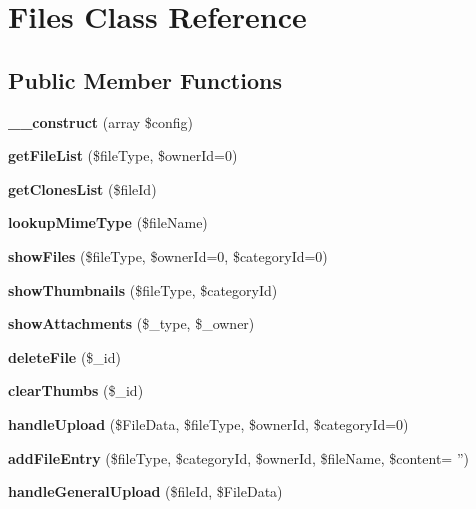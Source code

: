 \section{Files Class Reference}
\label{classFiles}
\subsection*{Public Member Functions}
\begin{CompactItemize}
\item 
{\bf \_\-\_\-construct} (array \$config)\label{classFiles_c8f4e34fc32feec14145501f50628898}

\item 
{\bf getFileList} (\$fileType, \$ownerId=0)\label{classFiles_8e5b2a325b9835fdaa0893b8da95f44a}

\item 
{\bf getClonesList} (\$fileId)\label{classFiles_abfde1bd35967b50d91fcfe577d614e8}

\item 
{\bf lookupMimeType} (\$fileName)\label{classFiles_7e78de9666fc5fadf7f96623f43b21b1}

\item 
{\bf showFiles} (\$fileType, \$ownerId=0, \$categoryId=0)\label{classFiles_5640a3025d33e3a21f44e360e7a1cafd}

\item 
{\bf showThumbnails} (\$fileType, \$categoryId)\label{classFiles_2d8ecb623c95c9f99278f1383c3f3bf3}

\item 
{\bf showAttachments} (\$\_\-type, \$\_\-owner)\label{classFiles_abaa4952b2737e085af51cdda0f9b11b}

\item 
{\bf deleteFile} (\$\_\-id)\label{classFiles_e79bd474c0e99f91c64e702f568f7a26}

\item 
{\bf clearThumbs} (\$\_\-id)\label{classFiles_e0a88d3280d5a780538e63427065cca7}

\item 
{\bf handleUpload} (\$FileData, \$fileType, \$ownerId, \$categoryId=0)\label{classFiles_838ee2d04d8b7444f8055e4e4397483a}

\item 
{\bf addFileEntry} (\$fileType, \$categoryId, \$ownerId, \$fileName, \$content= '')\label{classFiles_c855dc63451a8ceda61818469c9894d1}

\item 
{\bf handleGeneralUpload} (\$fileId, \$FileData)\label{classFiles_7b848b3b181bf37bf1156f9a557f2d1b}


\end{CompactItemize}
